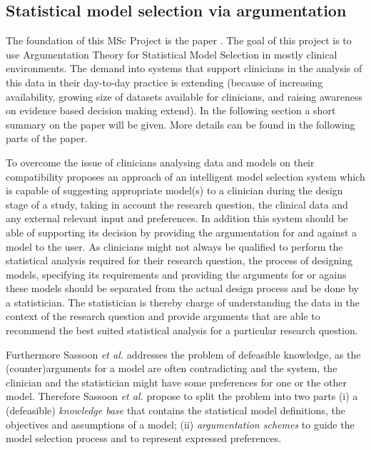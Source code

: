 \subsection{Statistical model selection via argumentation}
The foundation of this MSc Project is the paper \cite{sassoon2014}. 
The goal of this project is to use Argumentation Theory for Statistical Model Selection in mostly clinical environments. The demand into systems that support clinicians in the analysis of this data in their day-to-day practice is extending (because of increasing availability, growing size of datasets available for clinicians, and raising awareness on evidence based decision making extend). In the following section a short summary on the paper will be given. More details can be found in the following parts of the paper.

To overcome the issue of clinicians analysing data and models on their compatibility \cite{sassoon2014} proposes an approach of an intelligent model selection system which is capable of suggesting appropriate model(s) to a clinician during the design stage of a study, taking in account the research question, the clinical data and any external relevant input and preferences. In addition this system should be able of supporting its decision by providing the argumentation for and against a model to the user. As clinicians might not always be qualified to perform the statistical analysis required for their research question, the process of designing models, specifying its requirements and providing the arguments for or agains these models should be separated from the actual design process and be done by a statistician. The statistician is thereby  charge of understanding the data in the context of the research question and provide arguments that are able to recommend the best suited statistical analysis for a particular research question. 

Furthermore  Sassoon \textit{et al.} \cite{sassoon2014} addresses the problem of defeasible knowledge, as the (counter)arguments for a model are often contradicting and the system, the clinician and the statistician might have some preferences for one or the other model. Therefore Sassoon \textit{et al.} propose to split the problem into two parts (i) a (defeasible) \textit{knowledge base} that contains the statistical model definitions, the objectives and assumptions of a model; (ii) \textit{argumentation schemes} to guide the model selection process and to represent expressed preferences.

